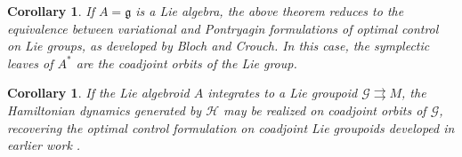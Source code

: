 \documentclass{article}
\newtheorem{corollary}[theorem]{Corollary}
\begin{document}
\begin{corollary}
If $A=\mathfrak g$ is a Lie algebra, the above theorem reduces to the equivalence between variational and Pontryagin formulations of optimal control on Lie groups, as developed by Bloch and Crouch.  
In this case, the symplectic leaves of $A^*$ are the coadjoint orbits of the Lie group.
\end{corollary}
\begin{corollary}
If the Lie algebroid $A$ integrates to a Lie groupoid $\mathcal{G} \rightrightarrows M$, the Hamiltonian dynamics generated by $\mathcal{H}$ may be realized on coadjoint orbits of $\mathcal{G}$, recovering the optimal control formulation on coadjoint Lie groupoids developed in earlier work \cite{Hagh}.
\end{corollary}
\end{document}
